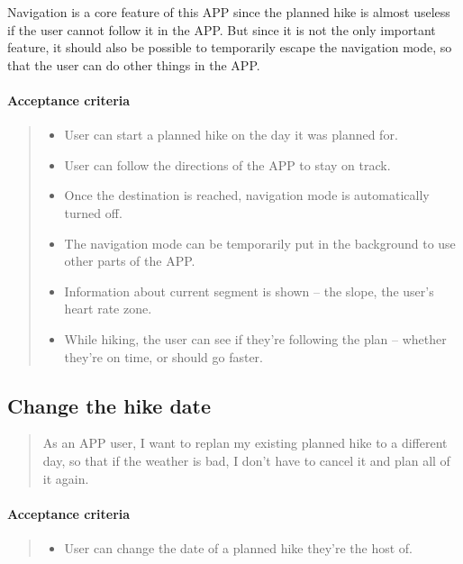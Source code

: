 Navigation is a core feature of this APP since the planned hike is almost useless if the user cannot follow it in the APP.
But since it is not the only important feature, it should also be possible to temporarily escape the navigation mode, so that the user can do other things in the APP.

\paragraph*{Acceptance criteria}
\begin{quote}
\begin{itemize}
    \item User can start a planned hike on the day it was planned for.
    \item User can follow the directions of the APP to stay on track.
    \item Once the destination is reached, navigation mode is automatically turned off.
    \item The navigation mode can be temporarily put in the background to use other parts of the APP.
    \item Information about current segment is shown -- the slope, the user's heart rate zone.
    \item While hiking, the user can see if they're following the plan -- whether they're on time, or should go faster.
\end{itemize}
\end{quote}

\subsection{Change the hike date}\label{US:map-hike-change}
\begin{quote}
As an APP user, I want to replan my existing planned hike to a different day, so that if the weather is bad, I don't have to cancel it and plan all of it again.
\end{quote}

\paragraph*{Acceptance criteria}
\begin{quote}
\begin{itemize}
    \item User can change the date of a planned hike they're the host of.
\end{itemize}
\end{quote}


